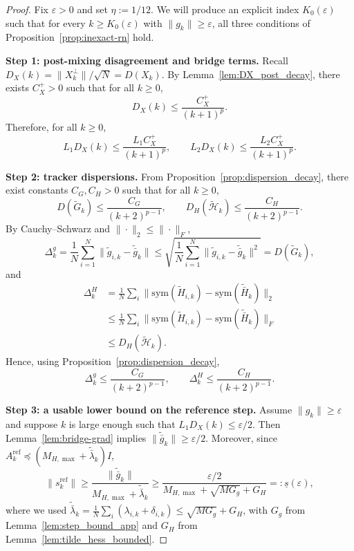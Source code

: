 \documentclass[10pt,twocolumn,letterpaper]{article}
\theoremstyle{compact}
\theoremstyle{compactremark}
\begin{document}
\begin{proof}
Fix $\varepsilon>0$ and set $\eta:=1/12$.
We will produce an explicit index $K_0(\varepsilon)$ such that for every $k\ge K_0(\varepsilon)$ with $\|g_k\|\ge \varepsilon$,
all three conditions of Proposition~\ref{prop:inexact-rn} hold.

\vspace{1pt}
\noindent\textbf{Step 1: post-mixing disagreement and bridge terms.}
Recall $D_X(k)=\|X_k^\perp\|/\sqrt N = D(X_k)$.
By Lemma~\ref{lem:DX_post_decay}, there exists $C_X^{+}>0$ such that for all $k\ge 0$,
\begin{equation}\label{eq:DX_post_decay_app}
D_X(k)\le \frac{C_X^{+}}{(k+1)^p}.
\end{equation}
Therefore, for all $k\ge 0$,
\begin{equation}\label{eq:bridge_targets_app}
L_1D_X(k)\le \frac{L_1C_X^{+}}{(k+1)^p},
\qquad
L_2D_X(k)\le \frac{L_2C_X^{+}}{(k+1)^p}.
\end{equation}

\vspace{1pt}
\noindent\textbf{Step 2: tracker dispersions.}
From Proposition~\ref{prop:dispersion_decay}, there exist constants $C_G,C_H>0$ such that for all $k\ge 0$,
\begin{equation}\label{eq:GH_decay_app}
D(\tilde G_k)\le \frac{C_G}{(k+2)^{p-1}},
\qquad
D_H(\tilde{\mathcal H}_k)\le \frac{C_H}{(k+2)^{p-1}}.
\end{equation}
By Cauchy--Schwarz and $\|\cdot\|_2\le \|\cdot\|_F$,
\[
\Delta_k^g
=\frac1N\sum_{i=1}^N\|\tilde g_{i,k}-\tilde{\bar g}_k\|
\le \sqrt{\frac1N\sum_{i=1}^N\|\tilde g_{i,k}-\tilde{\bar g}_k\|^2}
= D(\tilde G_k),
\]
and
\begin{align*}
\Delta_k^H
&=\tfrac1N\textstyle\sum_{i}\big\|\mathrm{sym}(\tilde H_{i,k})\!-\!\mathrm{sym}(\tilde{\bar H}_k)\big\|_2\\
&\le \tfrac1N\textstyle\sum_{i}\big\|\mathrm{sym}(\tilde H_{i,k})\!-\!\mathrm{sym}(\tilde{\bar H}_k)\big\|_F\\
&\le D_H(\tilde{\mathcal H}_k).
\end{align*}
Hence, using Proposition~\ref{prop:dispersion_decay},
\begin{equation}\label{eq:Delta_decay_app}
\Delta_k^g\le \frac{C_G}{(k+2)^{p-1}},
\qquad
\Delta_k^H\le \frac{C_H}{(k+2)^{p-1}}.
\end{equation}

\vspace{1pt}
\noindent\textbf{Step 3: a usable lower bound on the reference step.}
Assume $\|g_k\|\ge \varepsilon$ and suppose $k$ is large enough such that $L_1D_X(k)\le \varepsilon/2$.
Then Lemma~\ref{lem:bridge-grad} implies
$\|\tilde{\bar g}_k\|\ge \varepsilon/2$.
Moreover, since $A_k^{\mathrm{ref}}\preceq (M_{H,\max}+\tilde{\bar\lambda}_k)I$,
\[
\|s_k^{\mathrm{ref}}\|
\ge \frac{\|\tilde{\bar g}_k\|}{M_{H,\max}+\tilde{\bar\lambda}_k}
\ge \frac{\varepsilon/2}{M_{H,\max}+\sqrt{MG_g}+G_H}
=:\underline s(\varepsilon),
\]
where we used $\tilde{\bar\lambda}_k=\frac{1}{N}\sum_i(\lambda_{i,k}+\delta_{i,k})\le \sqrt{MG_g}+G_H$, with $G_g$ from Lemma~\ref{lem:step_bound_app} and $G_H$ from Lemma~\ref{lem:tilde_hess_bounded}.


\end{proof}
\end{document}
